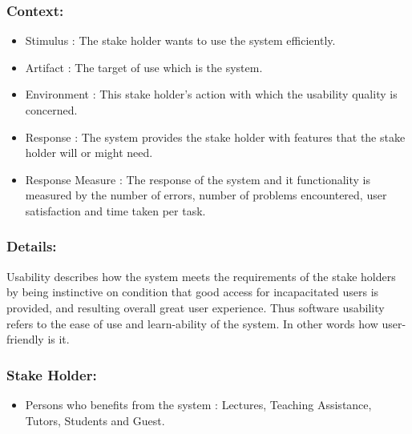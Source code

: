 \documentclass[11pt]{article}
\begin{document}
		\subsubsection{Context:}
			\begin{itemize}
				\item Stimulus : The stake holder wants to use the system efficiently.
				\item Artifact : The target of use which is the system.
				\item Environment : This stake holder’s action with which the usability quality is concerned.
				\item Response : The system provides the stake holder with features that the stake holder will or might need.
				\item Response Measure : The response of the system and it functionality is measured by the number of errors, number of problems encountered, user satisfaction and time taken per task.
			\end{itemize}
		
		\subsubsection{Details:}
			\textbf{}Usability describes how the system meets the requirements of the stake holders by being instinctive on condition that good access for incapacitated users is provided, and resulting overall great user experience. Thus software usability refers to the ease of use and learn-ability of the system. In other words how user-friendly is it.  
		
		\subsubsection{Stake Holder:}
			\begin{itemize}
				\item Persons who benefits from the system : Lectures, Teaching Assistance, Tutors, Students and Guest.
			\end{itemize}
				
\end{document}

